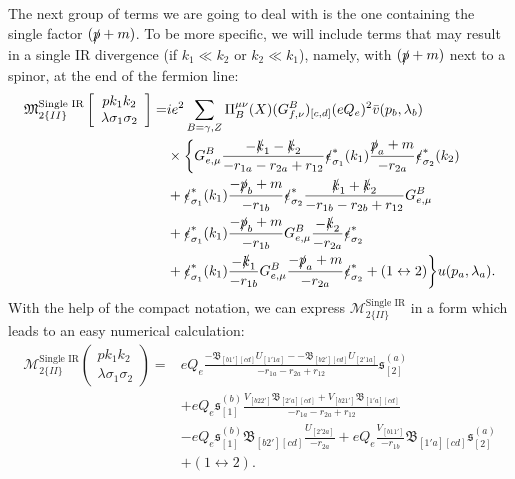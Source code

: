 The next group of terms we are going to deal with is the one containing the single factor $(\slashed p+m)$. To be more specific, we will include terms that may result in a single IR divergence (if $k_1\ll k_2$ or $k_2\ll k_1$), namely, with $(\slashed p+m)$ next to a spinor, at the end of the fermion line:
\begin{align}
\mathfrak{M}^{\text{Single IR}}_{2\{II\}}\left[\begin{array}{c}
pk_1k_2\\\lambda\sigma_1\sigma_2
\end{array}\right]
=&ie^2\sum_{B=\gamma,Z}\Pi_B^{\mu\nu}(X)(G^B_{f,\nu})_{[c,d]}(eQ_e)^2\bar{v}(p_b,\lambda_b)\nonumber\\
&\times\biggl\{ G^B_{e,\mu}\frac{-\slashed k_1-\slashed k_2}{-r_{1a}-r_{2a}+r_{12}}\slashed \epsilon^\ast_{\sigma_1}(k_1)\frac{\slashed p_a+m}{-r_{2a}} \slashed \epsilon^\ast_{\sigma_2}(k_2)\nonumber\\
&+\slashed\epsilon^\ast_{\sigma_1}(k_1)\frac{-\slashed p_b+m}{-r_{1b}}\slashed\epsilon^\ast_{\sigma_2}\frac{\slashed k_1+\slashed k_2}{-r_{1b}-r_{2b}+r_{12}}G^B_{e,\mu} \nonumber\\
&+\slashed\epsilon^\ast_{\sigma_1}(k_1)\frac{-\slashed p_b+m}{-r_{1b}}G^B_{e,\mu}\frac{-\slashed k_2}{-r_{2a}}\slashed\epsilon^\ast_{\sigma_2}\nonumber\\
&+\slashed\epsilon^\ast_{\sigma_1}(k_1)\frac{-\slashed k_1}{-r_{1b}}G^B_{e,\mu}\frac{-\slashed p_a+m}{-r_{2a}}\slashed\epsilon^\ast_{\sigma_2}+(1\leftrightarrow 2)\biggr\}u(p_a,\lambda_a).\nonumber\\
\end{align}
With the help of the compact notation, we can express $\mathcal{M}^\text{Single IR}_{2\{II\}}$ in a form which leads to an easy numerical calculation:
\begin{align}
\mathcal{M}^\text{Single IR}_{2\{II\}}\left(\begin{array}{c}
pk_1k_2\\\lambda\sigma_1\sigma_2
\end{array}\right)=&eQ_e\frac{-\mathfrak{B}_{[b1'][cd]}U_{[1'1a]}--\mathfrak{B}_{[b2'][cd]}U_{[2'1a]}}{-r_{1a}-r_{2a}+r_{12}}\mathfrak{s}^{(a)}_{[2]}\nonumber\\
&+eQ_e\mathfrak{s}^{(b)}_{[1]}\frac{V_{[b22']}\mathfrak{B}_{[2'a][cd]}+V_{[b21']}\mathfrak{B}_{[1'a][cd]}}{-r_{1a}-r_{2a}+r_{12}}\nonumber\\
&-eQ_e\mathfrak{s}^{(b)}_{[1]}\mathfrak{B}_{[b2'][cd]}\frac{U_{[2'2a]}}{-r_{2a}}+eQ_e\frac{V_{[b11']}}{-r_{1b}}\mathfrak{B}_{[1'a][cd]}\mathfrak{s}^{(a)}_{[2]}\nonumber\\
&+(1\leftrightarrow 2).
\end{align}
